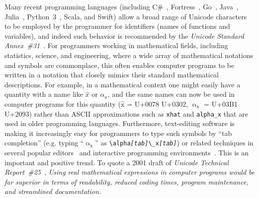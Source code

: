 \documentclass[10pt,english]{article}
\begin{document}
Many recent programming languages (including C\#~\cite{Csharp}, Fortress~\cite{Fortress}, 
Go~\cite{Go}, Java~\cite{Java}, Julia~\cite{Julia}, Python~3~\cite{Python}, Scala\cite{Scala}, and Swift\cite{Swift}) allow
a broad range of Unicode characters to be employed by the programmer
for identifiers (names of functions and variables), and indeed such
behavior is recommended by the \emph{Unicode Standard Annex~\#31}~\cite{UAX31}.
For programmers working in mathematical fields, including statistics,
science, and engineering, where a wide array of mathematical notations
and symbols are commonplace, this often enables computer programs
to be written in a notation that closely mimics their standard mathematical
descriptions. For example, in a mathematical context one might easily
have a quantity with a name like $\hat{x}$ or $\alpha_{x}$, and
the same names can now be used in computer programs for this quantity
($\mathrm{\hat{{x}}}$ = U+0078 U+0302, $\mathrm{{\upalpha_{x}}}$
= U+03B1 U+2093) rather than ASCII approximations such as \texttt{xhat}
and \texttt{alpha\_x} that are used in older programming languages.
Furthermore, text-editing software is making it increasingly easy
for programmers to type such symbols by ``tab completion''
(e.g. typing ``$\mathrm{{\upalpha_{x}}}$''
as \texttt{\textbackslash{}alpha}\texttt{\emph{{[}tab{]}}}\texttt{\textbackslash{}\_x}\texttt{\emph{{[}tab{]}}})
or related techniques in several popular editors~\cite{vsCode,Atom,Emacs,Sublime,Vim}
and interactive programming environments~\cite{Julia,IPython}. This
is an important and positive trend. To quote a 2001 draft of \emph{Unicode
Technical Report~\#25}~\cite[section 5.3]{UTR25}, \emph{Using real
mathematical expressions in computer programs would be far superior
in terms of readability, reduced coding times, program maintenance,
and streamlined documentation.}
\end{document}
